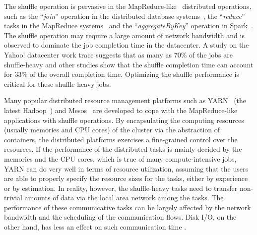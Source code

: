 \documentclass[10pt,journal,compsoc]{IEEEtran}
\begin{document}
The shuffle operation is pervasive in the MapReduce-like~\cite{dean2008mapreduce} distributed operations, 
such as the ``\emph{join}'' operation in the distributed database systems~\cite{thusoo2009hive, Yu:2008:DSG,Armbrust:2015:SSR}, 
the ``\emph{reduce}'' tasks in the MapReduce systems~\cite{dean2008mapreduce,vavilapalli2013apache}
and the ``\emph{aggregateByKey}'' operation in Spark~\cite{zaharia2012resilient}.
The shuffle operation may require a large amount of network bandwidth 
and is observed to dominate the job completion time in the datacenter.
A study on the Yahoo! datacenter work trace suggests that as many as 70\% of 
the jobs are shuffle-heavy and other studies show that the shuffle completion time
can account for 33\% of the overall completion time.
Optimizing the shuffle performance is critical for these
shuffle-heavy jobs.


Many popular distributed resource management platforms such as YARN~\cite{vavilapalli2013apache} (the latest Hadoop~\cite{white2015hadoop}) and Mesos~\cite{hindman2011mesos} are developed to cope with the 
MapReduce-like applications with shuffle operations. 
By encapsulating the computing resources (usually memories and CPU cores) of the cluster via the abstraction of containers, 
the distributed platforms exercises a fine-grained control over the resources. 
If the performance of the distributed tasks is mainly decided by the
memories and the CPU cores, which is true of
many compute-intensive jobs, YARN can do very well in terms of resource
utilization, assuming that the users are able to properly specify %
the resource sizes for the tasks, either by experience or by estimation. 
In reality, however, the shuffle-heavy tasks need to transfer 
non-trivial amounts of data via the local area network among the tasks.
The performance of these %
communicative tasks can be largely %
affected by the network bandwidth and the scheduling of the communication flows. 
Disk I/O, on the other hand, has less an effect on such communication time \cite{kavulya2010analysis}.

\end{document}
